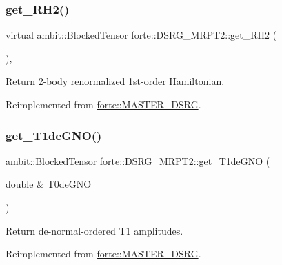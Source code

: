 \subsubsection{\texorpdfstring{get\+\_\+\+R\+H2()}{get\_RH2()}}
{\footnotesize\ttfamily virtual ambit\+::\+Blocked\+Tensor forte\+::\+D\+S\+R\+G\+\_\+\+M\+R\+P\+T2\+::get\+\_\+\+R\+H2 (\begin{DoxyParamCaption}{ }\end{DoxyParamCaption})\hspace{0.3cm}{\ttfamily [inline]}, {\ttfamily [virtual]}}



Return 2-\/body renormalized 1st-\/order Hamiltonian. 



Reimplemented from \mbox{\hyperlink{classforte_1_1_m_a_s_t_e_r___d_s_r_g_a4f300dd1d54dfe45f8db603a62f58b0e}{forte\+::\+M\+A\+S\+T\+E\+R\+\_\+\+D\+S\+RG}}.

\mbox{\label{classforte_1_1_d_s_r_g___m_r_p_t2_a3811b3a31c76af9a94621c2b13213443}} 
\subsubsection{\texorpdfstring{get\+\_\+\+T1de\+G\+N\+O()}{get\_T1deGNO()}}
{\footnotesize\ttfamily ambit\+::\+Blocked\+Tensor forte\+::\+D\+S\+R\+G\+\_\+\+M\+R\+P\+T2\+::get\+\_\+\+T1de\+G\+NO (\begin{DoxyParamCaption}\item[{double \&}]{T0de\+G\+NO }\end{DoxyParamCaption})\hspace{0.3cm}{\ttfamily [virtual]}}



Return de-\/normal-\/ordered T1 amplitudes. 



Reimplemented from \mbox{\hyperlink{classforte_1_1_m_a_s_t_e_r___d_s_r_g_a7eef5849acfd3aec1a2fbc5f981a5538}{forte\+::\+M\+A\+S\+T\+E\+R\+\_\+\+D\+S\+RG}}.

\mbox{\label{classforte_1_1_d_s_r_g___m_r_p_t2_a02e0b5b0716ac974c03b8ed5cef17980}} 
